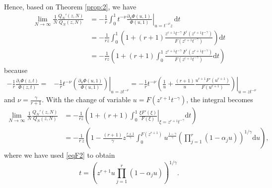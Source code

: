 \documentclass[12pt]{article}
\numberwithin{equation}{section}
\begin{document}
Hence, based on Theorem \ref{prop:2}, we have  
\begin{align*} 
	\lim_{N \to \infty} \frac{1}{N} \frac{Q_N'(z,N)}{Q_N(z,N)} 
	& =  - \frac{1}{r} \int_0^1 t^{-\nu} \left.\frac{  \partial_u \Phi(u,1) \ }{\Phi(u,1)}\right|_{u=t^{-\nu} z} \, \mathrm{d}t 
\\
	& = - \frac{1}{rz} \int_0^1 \left(1 + (r+1) \frac{z^{r+1} t^{-\gamma} \ F^\prime(z^{r+1} t^{-\gamma})}{F(z^{r+1} t^{-\gamma})} \right) \mathrm{d}t \\
	& = - \frac{1}{rz} \left(1 + (r+1)  \int_0^1 \frac{z^{r+1} t^{-\gamma} \ F^\prime(z^{r+1} t^{-\gamma})}{F(z^{r+1} t^{-\gamma})}\mathrm{d}t  \right) 
\end{align*} 
because 
\begin{align*}
	-  \frac{1}{r}\frac{\partial_z \Phi(z,t)}{\Phi(z,t)} 
	= & -  \frac{1}{r} t^{-\nu}\left.\left(\frac{\partial_u \Phi(u,1)}{\Phi(u,1)} \right)\right|_{u=z {t}^{-\nu}}
	= -  \frac{1}{r} t^{-\nu}\left.\left(\frac{1}{u} + \frac{(r+1)}{u}\frac{ u^{r+1} F'(u^{r+1})}{F(u^{r+1})} \right)\right|_{u=z {t}^{-\nu}}
\end{align*}
and $\nu=\frac{\gamma}{r+1}$. 
With the change of variable  $u=F(z^{r+1} t^{-\gamma})$, the integral becomes 
\begin{align*}
    \lim_{N \to \infty} \frac{1}{N} \frac{Q_N'(z,N)}{Q_N(z,N)} 
    & =  - \frac{1}{rz}\left( 1+ (r+1)\int_0^1 
    \left.\frac{ \xi F'(\xi)}{F(\xi)}\right|_{\xi=z^{r+1} {t}^{-\gamma}}   \mathrm{d}t\right) \\
	& = 	 - \frac{1}{r\,z}  
	\left( 1- \frac{(r+1)}{\gamma} z^{\frac{r+1}{\gamma}} \int_0^{F(z^{r+1})}  u^{\frac{1-\gamma}{\gamma}}\left(\prod_{j=1}^r (1-\alpha_j u)\right) ^{1/\gamma}	\mathrm{d}u  \right), 
\end{align*}
where we have used  \eqref{eqF2} to obtain 
\[
		 t = \left(z^{r+1}u \prod\limits_{j=1}^r \left(1 -\alpha_j u\right) \right)^{1/\gamma}. 
\]
\end{document}
